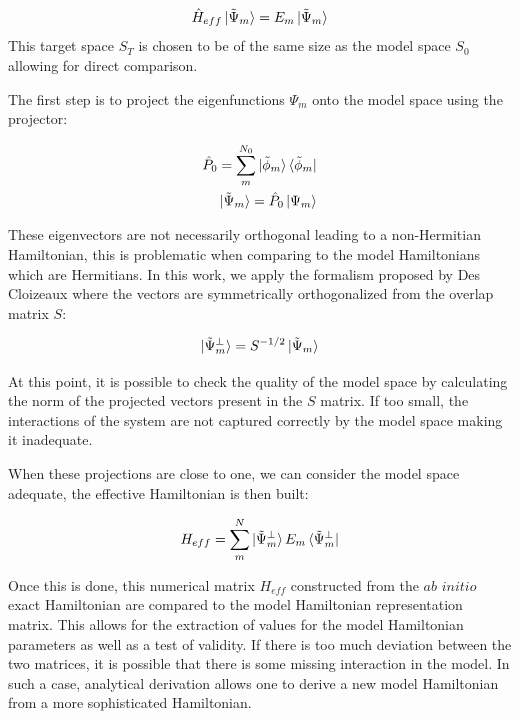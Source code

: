 \documentclass[12pt,a4paper]{report}
\numberwithin{equation}{section}
\begin{document}
\begin{equation}
    \hat{H}_{eff}\ket{\tilde{\Psi}_m}=E_m \ket{\tilde{\Psi}_m}
\end{equation}
This target space $S_T$ is chosen to be of the same size as the model space $S_0$ allowing for direct comparison.

The first step is to project the eigenfunctions $\Psi_m$ onto the model space using the projector:

\begin{align}
    \hat{P}_0=\sum_{m}^{N_0} \ket{\tilde{\phi}_m} \bra{\tilde{\phi}_m}\\
    \ket{\tilde{\Psi}_m}=\hat{P}_0 \ket{\Psi_m}
\end{align}

These eigenvectors are not necessarily orthogonal leading to a non-Hermitian Hamiltonian, this is problematic when comparing to the model Hamiltonians which are Hermitians.
In this work, we apply the formalism proposed by Des Cloizeaux where the vectors are symmetrically orthogonalized\cite{des_cloizeaux_extension_1960} from the overlap matrix $S$:

\begin{equation}
    \ket{\tilde{\Psi}_m^\bot}=S^{-1/2} \ket{\tilde{\Psi}_m}
\end{equation}

At this point, it is possible to check the quality of the model space by calculating the norm of the projected vectors present in the $S$ matrix.
If too small, the interactions of the system are not captured correctly by the model space making it inadequate. 
\par When these projections are close to one, we can consider the model space adequate, the effective Hamiltonian is then built:

\begin{equation}
    H_{eff}=\sum_{m}^{N}\ket{\tilde{\Psi}_m^{\bot}}E_m \bra{\tilde{\Psi}_m^{\bot}}
\end{equation}

Once this is done, this numerical matrix $H_{eff}$ constructed from the $\textit{ab}$ $\textit{initio}$ exact Hamiltonian are compared to the model Hamiltonian representation matrix. 
This allows for the extraction of values for the model Hamiltonian parameters as well as a test of validity.
If there is too much deviation between the two matrices, it is possible that there is some missing interaction in the model.
In such a case, analytical derivation allows one to derive a new model Hamiltonian from a more sophisticated Hamiltonian.
\end{document}
